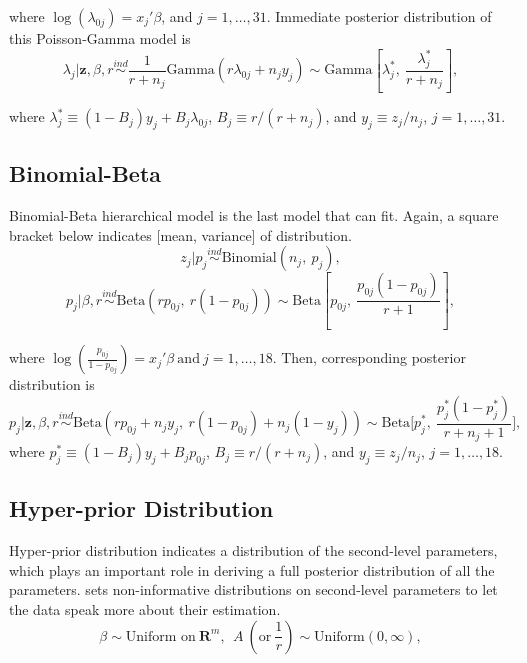 \documentclass[article]{jss}
\begin{document}
where $\log(\lambda_{0j}) =x_{j}'\beta$, and $j=1, \ldots, 31$. Immediate posterior distribution of this Poisson-Gamma model is
\begin{equation}
\lambda_{j}\vert \textbf{z}, \beta, r \stackrel{ind}{\sim}\frac{1}{r + n_{j}}\textrm{Gamma}(r\lambda_{0j} + n_{j}y_{j})\sim\textrm{Gamma}[\lambda^{\ast}_{j},~\frac{\lambda^{\ast}_{j}}{r+n_{j}}],
\end{equation}

where $\lambda^{\ast}_{j} \equiv (1-B_{j})y_{j} + B_{j}\lambda_{0j}$,  $B_{j}\equiv r / (r+n_{j})$, and $y_{j}\equiv z_{j} / n_{j}$, $j=1, \ldots, 31$. 

\subsection[Binomial-Beta]{Binomial-Beta}
Binomial-Beta hierarchical model is the last model that  can fit. Again, a square bracket below indicates [mean, variance] of distribution.
\begin{equation}
z_{j} \vert p_{j}\stackrel{ind}{\sim}\textrm{Binomial}(n_{j}, ~p_{j}),
\end{equation}
\begin{equation}
p_{j} \vert \beta, r\stackrel{ind}{\sim}\textrm{Beta}(rp_{0j},~ r(1-p_{0j}))\sim \textrm{Beta}[p_{0j}, ~\frac{p_{0j}(1-p_{0j})}{r + 1}],
\end{equation}

where $\log(\frac{p_{0j}}{1-p_{0j}}) =x_{j}'\beta~\textrm{and}~j=1, \ldots, 18$. Then, corresponding posterior distribution is
\begin{equation}
p_{j}\vert \textbf{z}, \beta, r \stackrel{ind}{\sim}\textrm{Beta}(rp_{0j}+n_{j}y_{j},~r(1-p_{0j})+n_{j}(1-y_{j}))\sim\textrm{Beta}\bigg[p^{\ast}_{j},~ \frac{p^{\ast}_{j}(1-p^{\ast}_{j})}{r+n_{j}+1}\bigg],
\end{equation}
where $p^{\ast}_{j}\equiv(1-B_{j})y_{j}+B_{j}p_{0j}$, $B_{j}\equiv r/ (r+n_{j})$, and $y_{j}\equiv z_{j} / n_{j}$, $j=1,\ldots,18$.


\subsection[Hyper-prior Distribution]{Hyper-prior Distribution}
Hyper-prior distribution indicates a distribution of the second-level parameters, which plays an important role in deriving a full posterior distribution of all the parameters.  sets non-informative distributions on second-level parameters to let the data speak more about their estimation.
\begin{equation}
\beta \sim \textrm{Uniform on}~ \mathbf{R}^{m},~~A ~(\textrm{or}~ \frac{1}{r})\sim \textrm{Uniform}(0, \infty),
\end{equation}
\end{document}
